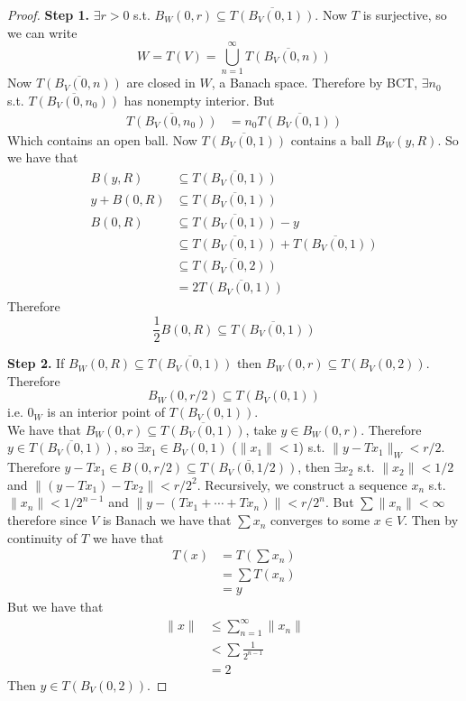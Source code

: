 \documentclass[11pt,a4paper]{article}
\theoremstyle{definition}
\theoremstyle{plain}
\theoremstyle{remark}
\newcommand{\norm}[1]{\lVert #1 \rVert}
\newcommand{\1}{\mathbbm{1}}
\begin{document}
\begin{proof}
    \textbf{Step 1.} $\exists r > 0$ s.t. $B_W(0, r) \subseteq \overline{T(B_V(0,1))}$. Now $T$ is surjective, so we can write 
    $$W = T(V) = \bigcup_{n=1}^\infty \overline{T(B_V(0,n))}$$
    Now $\overline{T(B_V(0,n))}$ are closed in $W$, a Banach space. Therefore by BCT, $\exists n_0$ s.t. $\overline{T(B_V(0, n_0))}$ has nonempty interior. 
    But 
    \begin{align*}
        \overline{T(B_V(0, n_0))} &= n_0 \overline{T(B_V(0,1))}
    \end{align*}
    Which contains an open ball. Now $\overline{T(B_V(0,1))}$ contains a ball $B_W(y, R)$. So we have that 
    \begin{align*}
        B(y, R) &\subseteq \overline{T(B_V(0,1))} \\
        y + B(0, R) &\subseteq \overline{T(B_V(0,1))} \\
        B(0, R) &\subseteq \overline{T(B_V(0,1))} - y \\
        &\subseteq \overline{T(B_V(0,1))} + \overline{T(B_V(0,1))} \\
        &\subseteq \overline{T(B_V(0,2))} \\
        &= 2 \overline{T(B_V(0,1))}  
    \end{align*}
    Therefore 
    $$\frac{1}{2} B(0, R) \subseteq \overline{T(B_V(0,1))}$$

    \textbf{Step 2.} If $B_W(0, R) \subseteq \overline{T(B_V(0,1))}$ then $B_W(0, r) \subseteq T(B_V(0, 2))$. Therefore 
    $$B_W(0, r/2) \subseteq T(B_V(0,1))$$ 
    i.e. $0_W$ is an interior point of $T(B_V(0,1))$.\\ 
    We have that $B_W(0, r) \subseteq \overline{T(B_V(0,1))}$, take $y \in B_W(0, r)$. Therefore $y \in \overline{T(B_V(0,1))}$, so $\exists x_1 \in B_V(0,1)$ ($\norm{x_1} < 1$) s.t. 
    $\norm{y-Tx_1}_W < r/2$. Therefore $y - Tx_1 \in B(0, r/2) \subseteq \overline{T(B_V(0,1/2))}$, then $\exists x_2$ s.t. $\norm{x_2} < 1/2$ and 
    $\norm{(y - Tx_1) - Tx_2} < r/2^2$. Recursively, we construct a sequence $x_n$ s.t. $\norm{x_n} < 1/2^{n-1}$ and $\norm{y - (Tx_1 + \cdots + Tx_n)} < r/2^n$. 
    But $\sum \norm{x_n} < \infty$ therefore since $V$ is Banach we have that $\sum x_n$ converges to some $x \in V$. Then by continuity of $T$ we have that 
    \begin{align*}
        T(x) &= T \left(\sum x_n\right) \\
        &= \sum T(x_n) \\
        &= y
    \end{align*}  
    But we have that 
    \begin{align*}
        \norm{x} &\le \sum_{n=1}^\infty \norm{x_n} \\
        &< \sum \frac{1}{2^{n-1}} \\
        &= 2
    \end{align*}
    Then $y \in T(B_V(0,2))$. 


\end{proof}
\end{document}
